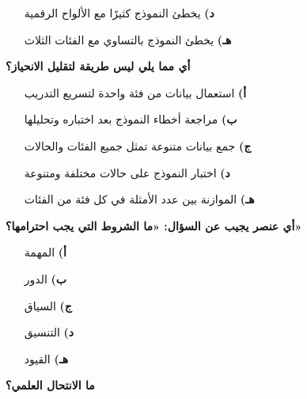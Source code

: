 \documentclass[11pt,a4paper]{article}
\begin{document}
\begin{multicols}{2}
\begin{minipage}{\linewidth}
\begin{itemize}[leftmargin=0.95cm, labelsep=4pt, itemsep=0pt, topsep=2pt, parsep=0pt]
  \item[\textbf{د)}] يخطئ النموذج كثيرًا مع الألواح الرقمية
  \item[\textbf{هـ)}] يخطئ النموذج بالتساوي مع الفئات الثلاث
\end{itemize}
\end{minipage}\par\vspace{7pt plus 4pt}
\noindent\begin{minipage}{\linewidth}
\hangindent=0.7cm\textbf{أي مما يلي ليس طريقة لتقليل الانحياز؟}
\begin{itemize}[leftmargin=0.95cm, labelsep=4pt, itemsep=0pt, topsep=2pt, parsep=0pt]
  \item[\textbf{أ)}] استعمال بيانات من فئة واحدة لتسريع التدريب
  \item[\textbf{ب)}] مراجعة أخطاء النموذج بعد اختباره وتحليلها
  \item[\textbf{ج)}] جمع بيانات متنوعة تمثل جميع الفئات والحالات
  \item[\textbf{د)}] اختبار النموذج على حالات مختلفة ومتنوعة
  \item[\textbf{هـ)}] الموازنة بين عدد الأمثلة في كل فئة من الفئات
\end{itemize}
\end{minipage}\par\vspace{7pt plus 4pt}
\noindent\begin{minipage}{\linewidth}
\hangindent=0.7cm\textbf{أي عنصر يجيب عن السؤال: «ما الشروط التي يجب احترامها؟»}
\begin{itemize}[leftmargin=0.95cm, labelsep=4pt, itemsep=0pt, topsep=2pt, parsep=0pt]
  \item[\textbf{أ)}] المهمة
  \item[\textbf{ب)}] الدور
  \item[\textbf{ج)}] السياق
  \item[\textbf{د)}] التنسيق
  \item[\textbf{هـ)}] القيود
\end{itemize}
\end{minipage}\par\vspace{7pt plus 4pt}
\noindent\begin{minipage}{\linewidth}
\hangindent=0.7cm\textbf{ما الانتحال العلمي؟}
\begin{itemize}[leftmargin=0.95cm, labelsep=4pt, itemsep=0pt, topsep=2pt, parsep=0pt]

\end{itemize}
\end{minipage}
\end{multicols}
\end{document}
